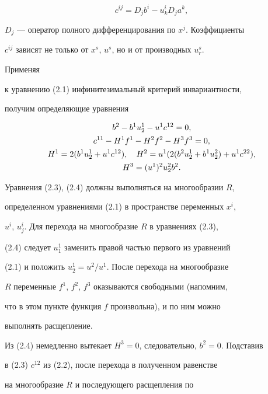 \begin{equation} 


c^{ij}=D_j b^i-u^i_k D_j a^k, 


\end{equation} 


$D_j$ --- оператор полного дифференцирования по $x^j$. Коэффициенты 


$c^{ij}$ зависят не только от $x^s$, $u^s$, но и от производных $u^s_r$. 


Применяя 


к уравнению (2.1) инфинитезимальный критерий инвариантности, 


получим определяющие уравнения 


\begin{gather} 


b^2-b^1u^1_2-u^1c^{12}=0,\\ 


c^{11}-H^1f^1-H^2f^2-H^3f^3=0,\\ 


H^1=2(b^1u^1_2+u^1c^{12}),\quad 


H^2=u^1(2(b^2u^1_2+b^1u^2_2)+u^1c^{22}),\notag\\ 


H^3=(u^1)^2u^2_2b^2.\notag 


\end{gather} 


Уравнения (2.3), (2.4) должны выполняться на многообразии $R$, 


определенном уравнениями (2.1) в пространстве переменных $x^i$, 


$u^i$, $u^i_j$. Для перехода на многообразие $R$ в уравнениях (2.3), 


(2.4) следует $u^1_1$ заменить правой частью первого из уравнений 


(2.1) и положить $u^1_2=u^2/u^1$. После перехода на многообразие 


$R$ переменные $f^1$, $f^2$, $f^3$ оказываются свободными (напомним, 


что в этом пункте функция $f$ произвольна), и по ним можно 


выполнять расщепление. 


 


Из (2.4) немедленно вытекает $H^3=0$, следовательно, $b^2=0$. Подставив 


в (2.3) $c^{12}$ из (2.2), после перехода в полученном равенстве 


на многообразие $R$ и последующего расщепления по 


